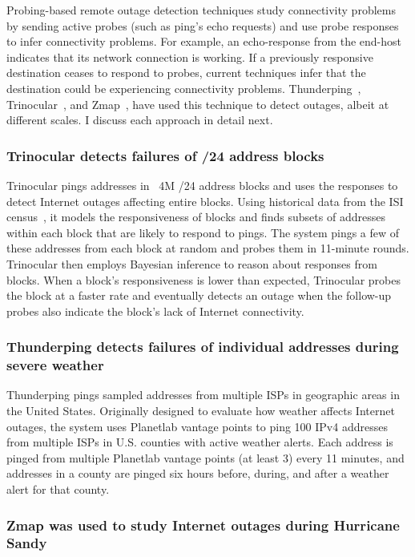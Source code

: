 Probing-based remote outage detection techniques study connectivity problems by
sending active probes (such as ping's echo requests) and use probe
responses to infer connectivity problems. For example, an
echo-response from the end-host indicates that its network connection
is working. If a previously responsive destination ceases to respond
to probes, current techniques infer that the destination could be
experiencing connectivity problems. Thunderping~\cite{pingin},
Trinocular~\cite{trinocular}, and Zmap~\cite{durumeric2013zmap}, have
used this technique to detect outages, albeit at different scales. I
discuss each approach in detail next.

\subsubsection{Trinocular detects failures of /24 address blocks}

Trinocular pings addresses in ~4M /24 address blocks and
uses the responses to detect Internet outages affecting entire blocks. Using historical
data from the ISI census~\cite{census-survey}, it models the responsiveness of
blocks and finds subsets of addresses within each block that are
likely to respond to pings. The system pings a few of these addresses
from each block at random and probes them in 11-minute
rounds. Trinocular then employs Bayesian inference to reason about
responses from blocks. When a block's responsiveness is lower than
expected, Trinocular probes the block at a faster rate and eventually
detects an outage when the follow-up probes also indicate the block's
lack of Internet connectivity.

\subsubsection{Thunderping detects failures of individual addresses
  during severe weather}

Thunderping pings
sampled addresses from multiple ISPs in geographic areas in the United
States. Originally designed to evaluate how weather affects Internet
outages, the system uses Planetlab vantage points to ping 100 IPv4
addresses from multiple ISPs in U.S. counties with active
weather alerts. Each address is pinged from multiple Planetlab vantage
points (at least 3) every 11 minutes, and addresses in a county are
pinged six hours before, during, and after a weather alert for that
county. 


\subsubsection{Zmap was used to study Internet outages during
  Hurricane Sandy}

